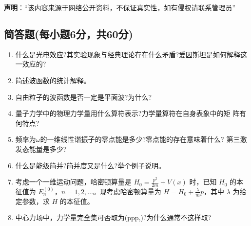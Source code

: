 
\textbf{声明}：“该内容来源于网络公开资料，不保证真实性，如有侵权请联系管理员”

\subsection{简答题(每小题6分，共60分)}
\begin{enumerate}
\item 什么是光电效应?其实验现象与经典理论存在什么矛盾?爱因斯坦是如何解释这一效应的?
\item 简述波函数的统计解释。
\item 自由粒子的波函数是否一定是平面波?为什么?
\item 量子力学中的物理力学量用什么算符表示?力学量算符在自身表象中的矩
阵有何特点?
\item 频率为$\omega$的一维线性谐振子的零点能是多少?零点能的存在意味着什么?
第三激发态能量是多少?
\item 什么是能级简并?简并度又是什么?举个例子说明。
\item 考虑一个一维运动问题，哈密顿算量是 $H_0 = \frac{p^2}{2m} + V(x)$ 时，已知 $H_0$ 的本征值为 $E_n^{(0)}$，$n = 1, 2, \dots$。现考虑哈密顿算量为 $H = H_0 + \frac{\lambda}{m} p$，其中 $\lambda$ 为给定参数，求 $H$ 的本征值。
\item 中心力场中，力学量完全集可否取为(ppp,)?为什么通常不这样取?
\end{enumerate}
